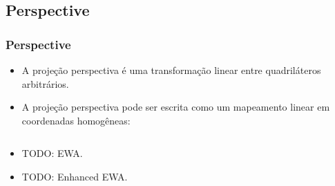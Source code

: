 \documentclass{beamer}
\begin{document}
\subsection{Perspective}
\begin{frame}
 \frametitle{Perspective}
 \begin{itemize}
  \item A projeção perspectiva é uma transformação linear entre quadriláteros
arbitrários.
  \item A projeção perspectiva pode ser escrita como um mapeamento linear em
coordenadas homogêneas:
 \end{itemize}

\begin{columns}[c]
\column{1.5in}
\column{1.5in}
\end{columns}

\end{frame}

\begin{frame}
 \begin{itemize}
  \item TODO: EWA.
  \item TODO: Enhanced EWA.
 \end{itemize}
\end{frame}

\end{document}
